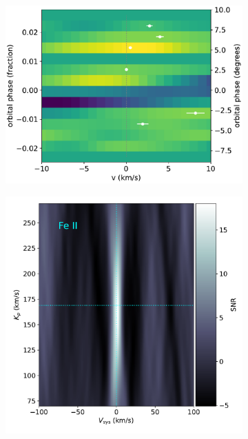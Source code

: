 \documentclass[twocolumn]{aastex631}
\begin{document}
\begin{figure}[ht!]
\begin{subfigure}[b]{0.333\textwidth}
            \end{subfigure}
            \begin{subfigure}[b]{0.333\textwidth}\label{fig:wind-chars-Fe-combined}
                \includegraphics[width=\textwidth]{plots-updated/line-velocity/binned/pcolor/points/KELT-20b.Fe.phase-binned+RVs.pdf}
                
            \end{subfigure}

            \begin{subfigure}[b]{0.333\textwidth}\label{fig:2d-ccf-Fe+-combined}
                \includegraphics[width=\textwidth]{plots-updated/kp-vsys-map/combined/KELT-20b.20190504.combined.Fe+.CCFs-shifted.pdf}
                

\end{subfigure}
\end{figure}
\end{document}
